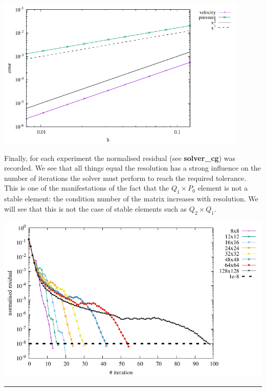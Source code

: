 \begin{center}
\includegraphics[width=12cm]{python_codes/fieldstone_15/results/errors.pdf}
\end{center}

Finally, for each experiment the normalised residual (see {\bf solver\_cg}) was recorded. We see that 
all things equal the resolution has a strong influence on the number of iterations the solver must
perform to reach the required tolerance. This is one of the manifestations of the fact that the 
$Q_1 \times P_0$ element is not a stable element: the condition number of the matrix increases with 
resolution. We will see that this is not the case of stable elements such as $Q_2\times Q_1$.

\begin{center}
\includegraphics[width=14cm]{python_codes/fieldstone_15/results/residual.pdf}
\end{center}

\par\noindent\rule{\textwidth}{0.4pt}

\vspace{.5cm}

\begin{center}
\end{center}

